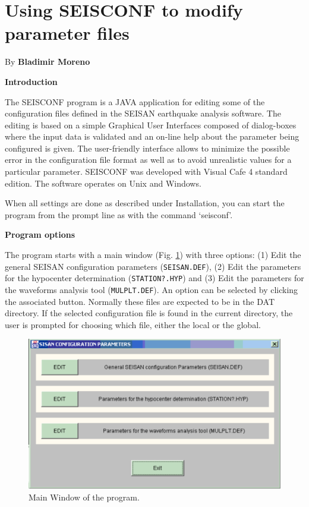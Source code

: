 \section{Using SEISCONF to modify parameter files}

By \textbf{Bladimir Moreno}

\textbf{Introduction}

The SEISCONF program is a JAVA application for editing some of the configuration files defined in the SEISAN earthquake analysis software. The editing is based on a simple Graphical User Interfaces composed of dialog-boxes where the input data is validated and an on-line help about the parameter being configured is given. The user-friendly interface allows to minimize the possible error in the configuration file format as well as to avoid unrealistic values for a particular parameter. SEISCONF was developed with Visual Cafe 4 standard edition. The software operates on Unix and Windows. 

When all settings are done as described under Installation, you can start the program from the prompt line as with the command `seisconf'. 

\textbf{Program options}

The program starts with a main window (Fig. \ref{fig:main-window}) with three options: 
(1) Edit the general SEISAN configuration parameters 
(\texttt{SEISAN.DEF}), (2) Edit the parameters for the hypocenter 
determination (\texttt{STATION?.HYP}) and (3) Edit the parameters for the 
waveforms analysis tool (\texttt{MULPLT.DEF}). An option can be selected 
by clicking the associated button. Normally these files are expected 
to be in the DAT directory. If the selected configuration file is 
found in the current directory, the user is prompted for choosing 
which file, either the local or the global. 

%

\begin{figure}
\centerline{\includegraphics[width=0.9\linewidth]{fig/fig2}}
\caption{Main Window of the program.}
\label{fig:main-window}
\end{figure}

